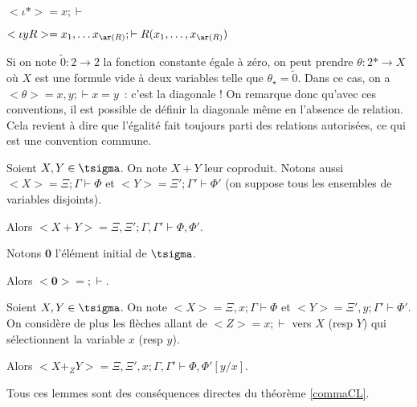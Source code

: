 \begin{exs}
    \item $<\iota\ast> = x;\vdash$
    \item $<\iota yR> = x_1,\dots x_{\ar(R)};\vdash R(x_1, \dots, x_{\ar(R)})$
    \item Si on note $\tilde{0} : 2\rightarrow 2$ la fonction constante égale à
        zéro, on peut prendre $\theta : 2\ast\rightarrow X$ où $X$ est une formule
        vide à deux variables telle que $\theta_\star = \tilde{0}$. Dans ce cas, on
        a $<\theta> = x,y;\vdash x = y$~: c'est la diagonale ! On remarque donc
        qu'avec ces conventions, il est possible de définir la diagonale même en
        l'absence de relation. Cela revient à dire que l'égalité fait toujours
        parti des relations autorisées, ce qui est une convention commune.
\end{exs}

\begin{lem}
    Soient $X,Y\in\tsigma$. On note $X+Y$ leur coproduit. Notons aussi
    $<X> = \Xi;\Gamma\vdash\Phi$ et $<Y> = \Xi';\Gamma'\vdash\Phi'$ (on suppose
    tous les ensembles de variables disjoints).
    
    Alors $<X+Y> = \Xi,\Xi';\Gamma,\Gamma'\vdash\Phi,\Phi'$.
\end{lem}

\begin{lem}
    Notons $\mathbf{0}$ l'élément initial de $\tsigma$.
    
    Alors $<\mathbf{0}> = ;\vdash$.
\end{lem}

\begin{lem}
    Soient $X,Y\in\tsigma$. On note $<X> = \Xi,x;\Gamma\vdash\Phi$ et
    $<Y> = \Xi',y;\Gamma'\vdash\Phi'$. On considère de plus les flèches allant de
    $<Z> = x;\vdash$ vers $X$ (resp $Y$) qui sélectionnent la variable $x$ (resp $y$).

    Alors $<X +_Z Y> = \Xi,\Xi',x;\Gamma,\Gamma'\vdash\Phi,\Phi'[y/x]$.
\end{lem}

\begin{pv}
    Tous ces lemmes sont des conséquences directes du théorème \ref{commaCL}.
\end{pv}


